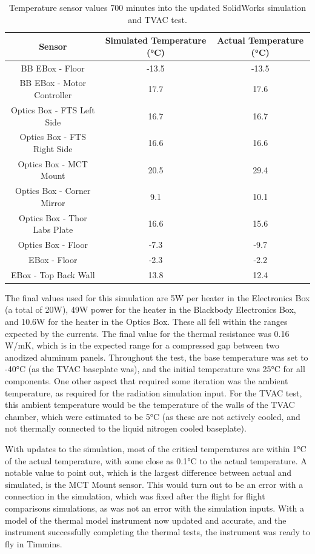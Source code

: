 \begin{table}[h]
\begin{center}
\begin{tabular}{ |c|c|c| }
 \hline
 \rowcolor{lightgray}
 Sensor & Simulated Temperature (°C) & Actual Temperature (°C)\\
  \hline
  \hline
  BB EBox - Floor & -13.5 & -13.5\\
 \hline
  BB EBox - Motor Controller & 17.7 & 17.6\\
 \hline
 Optics Box - FTS Left Side & 16.7 & 16.7\\
 \hline
 Optics Box - FTS Right Side & 16.6 & 16.6\\
 \hline
 Optics Box - MCT Mount & 20.5 & 29.4\\
 \hline
 Optics Box - Corner Mirror & 9.1 & 10.1\\
 \hline
 Optics Box - Thor Labs Plate & 16.6 & 15.6\\
 \hline
 Optics Box - Floor & -7.3 & -9.7\\
 \hline
 EBox - Floor & -2.3 & -2.2\\
 \hline
 EBox - Top Back Wall & 13.8 & 12.4\\
 \hline
\end{tabular}
\end{center}
\caption{Temperature sensor values 700 minutes into the updated SolidWorks simulation and TVAC test.}
 \label{TVAC_temps}
\end{table}

The final values used for this simulation are 5W per heater in the Electronics Box (a total of 20W), 49W power for the heater in the Blackbody Electronics Box, and 10.6W for the heater in the Optics Box. These all fell within the ranges expected by the currents. The final value for the thermal resistance was 0.16 W/mK, which is in the expected range for a compressed gap between two anodized aluminum panels. Throughout the test, the base temperature was set to -40°C (as the TVAC baseplate was), and the initial temperature was 25°C for all components. One other aspect that required some iteration was the ambient temperature, as required for the radiation simulation input. For the TVAC test, this ambient temperature would be the temperature of the walls of the TVAC chamber, which were estimated to be 5°C (as these are not actively cooled, and not thermally connected to the liquid nitrogen cooled baseplate). 

With updates to the simulation, most of the critical temperatures are within 1°C of the actual temperature, with some close as 0.1°C to the actual temperature. A notable value to point out, which is the largest difference between actual and simulated, is the MCT Mount sensor. This would turn out to be an error with a connection in the simulation, which was fixed after the flight for flight comparisons simulations, as was not an error with the simulation inputs. With a model of the thermal model instrument now updated and accurate, and the instrument successfully completing the thermal tests, the instrument was ready to fly in Timmins.


